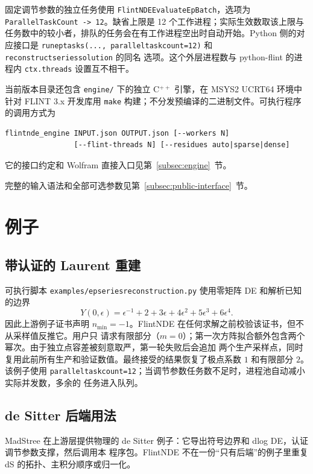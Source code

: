 \documentclass[11pt,a4paper]{ctexart}
\renewcommand{\_}{\origunderscore\allowbreak}
\begin{document}
固定调节参数的独立任务使用 \texttt{FlintNDE}\allowbreak\texttt{EvaluateEpBatch}，选项为
\texttt{Parallel}\allowbreak\texttt{TaskCount -> 12}。缺省上限是 12 个工作进程；实际生效数取该上限与
任务数中的较小者，排队的任务会在有工作进程空出时自动开始。Python 侧的对应接口是
\texttt{run\_ep\_tasks(..., parallel\_task\_count=12)} 和 \texttt{reconstruct\_series\_solution} 的同名
选项。这个外层进程数与 python-flint 的进程内 \texttt{ctx.threads} 设置互不相干。

当前版本目录还包含 \texttt{engine/} 下的独立 C$^{++}$ 引擎，在 MSYS2 UCRT64 环境中针对 FLINT 3.x
开发库用 \texttt{make} 构建；不分发预编译的二进制文件。可执行程序的调用方式为
\begin{verbatim}
flintnde_engine INPUT.json OUTPUT.json [--workers N]
                [--flint-threads N] [--residues auto|sparse|dense]
\end{verbatim}
它的接口约定和 Wolfram 直接入口见第~\ref{subsec:engine}~节。

完整的输入语法和全部可选参数见第~\ref{subsec:public-interface}~节。

\section{例子}
\label{sec:examples}

\subsection{带认证的 Laurent 重建}

可执行脚本 \texttt{examples/ep\_series\_reconstruction.py} 使用零矩阵 DE 和解析已知的边界
\begin{equation}
 Y(0,\epsilon)=\epsilon^{-1}+2+3\epsilon+4\epsilon^2+5\epsilon^3+6\epsilon^4.
\end{equation}
因此上游例子证书声明 $n_{\min}=-1$。FlintNDE 在任何求解之前校验该证书，但不从采样值反推它。用户只
请求有限部分（$m=0$）；第一次方阵拟合额外包含两个幂次。由于独立点容差被刻意取严，第一轮失败后会追加
两个生产采样点，同时复用此前所有生产和验证数值。最终接受的结果恢复了极点系数 $1$ 和有限部分 $2$。
该例子使用 \texttt{parallel\_task\_count=12}；当调节参数任务数不足时，进程池自动减小实际并发数，多余的
任务进入队列。

\subsection{de Sitter 后端用法}

MadStree 在上游层提供物理的 de Sitter 例子：它导出符号边界和 dlog DE，认证调节参数支撑，然后调用本
程序包。FlintNDE 不在一份“只有后端”的例子里重复 dS 的拓扑、主积分顺序或归一化。
\end{document}

